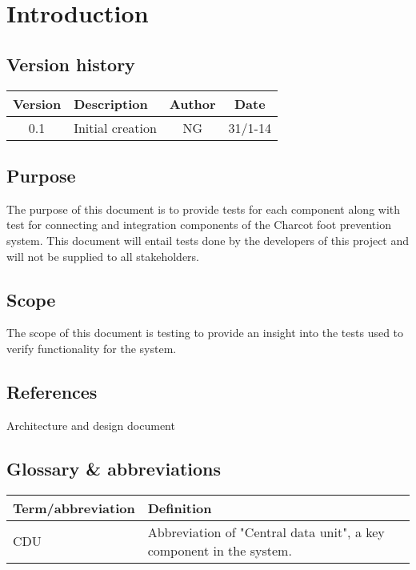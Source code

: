 \chapter{Introduction}
\section{Version history}
\begin{table}[H]
\begin{tabular}{|c|p{9cm}|c|c|}
\hline
Version & Description & Author & Date\\ \hline
0.1 & Initial creation & NG & 31/1-14 \\
\hline
\end{tabular}
\end{table}

\section{Purpose}
The purpose of this document is to provide tests for each component along with test for connecting and integration components of the Charcot foot prevention system. This document will entail tests done by the developers of this project and will not be supplied to all stakeholders.

\section{Scope}
The scope of this document is testing to provide an insight into the tests used to verify functionality for the system.

\section{References}
Architecture and design document

\section{Glossary \& abbreviations}
\begin{table}[H]
\centering
\begin{tabular}{|p{4cm}|p{7cm}|}
\hline
Term/abbreviation & Definition\\ \hline
CDU & Abbreviation of "Central data unit", a key component in the system. \\ \hline
\end{tabular}
\end{table}
